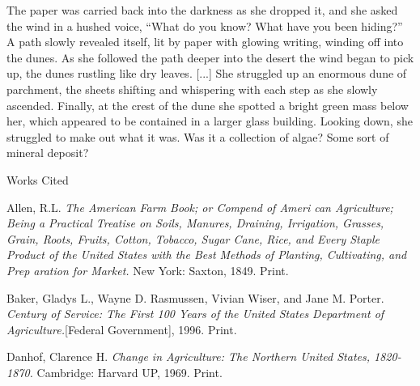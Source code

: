 \documentclass[12pt]{article}
\newcommand{\bibent}{\noindent \hangindent 40pt}
\newenvironment{workscited}{\newpage \begin{center} Works Cited \end{center}}{\newpage }
\begin{document}
\begin{flushleft}
​The paper was carried back into the darkness as she dropped it, and she asked the wind in a hushed voice, “What do you know? What have you been hiding?” 
A path slowly revealed itself, lit by paper with glowing writing, winding off into the dunes. As she followed the path deeper into the desert the wind began to pick up, the dunes rustling like dry leaves. 
[...]
​She struggled up an enormous dune of parchment, the sheets shifting and whispering with each step as she slowly ascended. Finally, at the crest of the dune she spotted a bright green mass below her, which appeared to be contained in a larger glass building. Looking down, she struggled to make out what it was. Was it a collection of algae? Some sort of mineral deposit? 
\newpage

\begin{workscited}

\bibent
Allen, R.L. \textit{The American Farm Book; or Compend of Ameri can Agriculture; Being a Practical Treatise on Soils, Manures, Draining, Irrigation, Grasses, Grain, Roots, Fruits, Cotton, Tobacco, Sugar Cane, Rice, and Every Staple Product of the United States with the Best Methods of Planting, Cultivating, and Prep aration for Market.} New York: Saxton, 1849. Print.

\bibent
Baker, Gladys L., Wayne D. Rasmussen, Vivian Wiser, and Jane M. Porter. \textit{Century of Service: The First 100 Years of the United States Department of Agriculture.}[Federal Government], 1996. Print.

\bibent
Danhof, Clarence H. \textit{Change in Agriculture: The Northern United States, 1820-1870.} Cambridge: Harvard UP, 1969. Print.


\end{workscited}

\end{flushleft}
\end{document}
